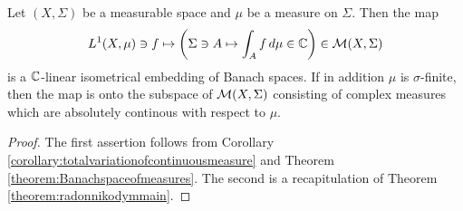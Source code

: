 \begin{corollary}
    Let $(X,\Sigma)$ be a measurable space and $\mu$ be a measure on $\Sigma$. Then the map
    $$L^1(X,\mu)\ni f\mapsto \left(\Sigma \ni A \mapsto \int_Af\,d\mu\in {\mathbb C}\right)\in {\mathcal M}(X,\Sigma)$$
    is a ${\mathbb C}$-linear isometrical embedding of Banach spaces. If in addition $\mu$ is $\sigma$-finite, then the map is onto the subspace of ${\mathcal M}(X,\Sigma)$ consisting of complex measures which are absolutely continous with respect to $\mu$.
\end{corollary}
\begin{proof}
    The first assertion follows from Corollary \ref{corollary:totalvariationofcontinuousmeasure} and Theorem \ref{theorem:Banachspaceofmeasures}. The second is a recapitulation of Theorem \ref{theorem:radonnikodymmain}.
\end{proof}







\small



